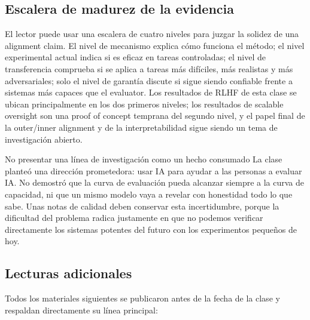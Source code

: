\subsection{Escalera de madurez de la evidencia}

El lector puede usar una escalera de cuatro niveles para juzgar la solidez de una alignment claim. El nivel de mecanismo explica cómo funciona el método; el nivel experimental actual indica si es eficaz en tareas controladas; el nivel de transferencia comprueba si se aplica a tareas más difíciles, más realistas y más adversariales; solo el nivel de garantía discute si sigue siendo confiable frente a sistemas más capaces que el evaluator. Los resultados de RLHF de esta clase se ubican principalmente en los dos primeros niveles; los resultados de scalable oversight son una proof of concept temprana del segundo nivel, y el papel final de la outer/inner alignment y de la interpretabilidad sigue siendo un tema de investigación abierto.

\begin{warningbox}{No presentar una línea de investigación como un hecho consumado}
La clase planteó una dirección prometedora: usar IA para ayudar a las personas a evaluar IA. No demostró que la curva de evaluación pueda alcanzar siempre a la curva de capacidad, ni que un mismo modelo vaya a revelar con honestidad todo lo que sabe. Unas notas de calidad deben conservar esta incertidumbre, porque la dificultad del problema radica justamente en que no podemos verificar directamente los sistemas potentes del futuro con los experimentos pequeños de hoy.
\end{warningbox}

\subsection{Lecturas adicionales}

Todos los materiales siguientes se publicaron antes de la fecha de la clase y respaldan directamente su línea principal:

